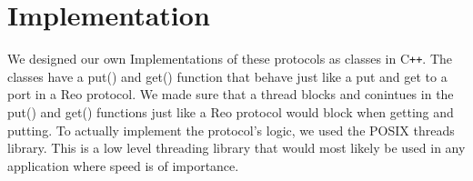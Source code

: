 \section{Implementation}

We designed our own Implementations of these protocols as classes in C\texttt{++}.
The classes have a put() and get() function that behave just like a put and get to a port in a Reo protocol.
We made sure that a thread blocks and conintues in the put() and get() functions just like a Reo protocol would block when getting and putting.
To actually implement the protocol's logic, we used the POSIX threads library.
This is a low level threading library that would most likely be used in any application where speed is of importance.
